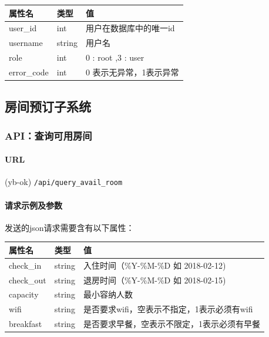 \documentclass[]{article}
\let\oldparagraph\paragraph
\renewcommand{\paragraph}[1]{\oldparagraph{#1}\mbox{}}
\begin{document}
\begin{longtable}[]{@{}lll@{}}
\toprule
属性名 & 类型 & 值\tabularnewline
\midrule
\endhead
user\_id & int & 用户在数据库中的唯一id\tabularnewline
username & string & 用户名\tabularnewline
role & int & 0 : root ,3 : user\tabularnewline
error\_code & int & 0 表示无异常，1表示异常\tabularnewline
\bottomrule
\end{longtable}

\hypertarget{ux623fux95f4ux9884ux8ba2ux5b50ux7cfbux7edf}{%
\subsection{房间预订子系统}\label{ux623fux95f4ux9884ux8ba2ux5b50ux7cfbux7edf}}

\hypertarget{apiux67e5ux8be2ux53efux7528ux623fux95f4}{%
\subsubsection{API：查询可用房间}\label{apiux67e5ux8be2ux53efux7528ux623fux95f4}}

\hypertarget{url-1}{%
\paragraph{URL}\label{url-1}}

(yb-ok) \texttt{/api/query\_avail\_room}

\hypertarget{ux8bf7ux6c42ux793aux4f8bux53caux53c2ux6570}{%
\paragraph{请求示例及参数}\label{ux8bf7ux6c42ux793aux4f8bux53caux53c2ux6570}}

\begin{Shaded}
\begin{Highlighting}[]
\FunctionTok{\{}
    \FunctionTok{:}\FunctionTok{,}
\FunctionTok{\}}
\end{Highlighting}
\end{Shaded}

发送的json请求需要含有以下属性：

\begin{longtable}[]{@{}lll@{}}
\toprule
属性名 & 类型 & 值\tabularnewline
\midrule
\endhead
check\_in & string & 入住时间（\%Y-\%M-\%D 如 2018-02-12)\tabularnewline
check\_out & string & 退房时间（\%Y-\%M-\%D 如
2018-02-15)\tabularnewline
capacity & string & 最小容纳人数\tabularnewline
wifi & string &
是否要求wifi，空表示不指定，1表示必须有wifi\tabularnewline
breakfast & string &
是否要求早餐，空表示不限定，1表示必须有早餐\tabularnewline
\bottomrule
\end{longtable}
\end{document}
